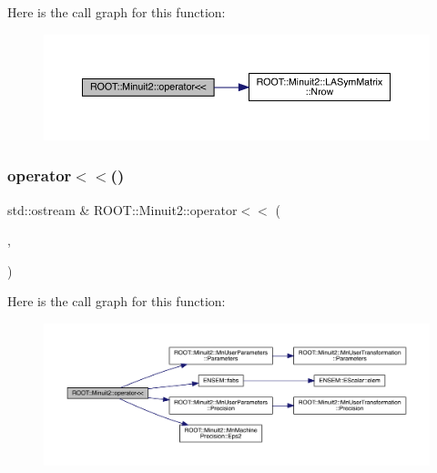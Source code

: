 Here is the call graph for this function\+:\nopagebreak
\begin{figure}[H]
\begin{center}
\leavevmode
\includegraphics[width=350pt]{d6/d3a/namespaceROOT_1_1Minuit2_a37c2d73b40109f988c5ea59e1edf1f8d_cgraph}
\end{center}
\end{figure}
\mbox{\label{namespaceROOT_1_1Minuit2_a950e1e56f48df042ba519464bda3f1ea}} 
\subsubsection{\texorpdfstring{operator$<$$<$()}{operator<<()}\hspace{0.1cm}{\footnotesize\ttfamily [5/11]}}
{\footnotesize\ttfamily std\+::ostream \& R\+O\+O\+T\+::\+Minuit2\+::operator$<$$<$ (\begin{DoxyParamCaption}\item[{std\+::ostream \&}]{,  }\item[{const \mbox{\hyperlink{classROOT_1_1Minuit2_1_1MnUserParameters}{Mn\+User\+Parameters}} \&}]{ }\end{DoxyParamCaption})}

Here is the call graph for this function\+:\nopagebreak
\begin{figure}[H]
\begin{center}
\leavevmode
\includegraphics[width=350pt]{d6/d3a/namespaceROOT_1_1Minuit2_a950e1e56f48df042ba519464bda3f1ea_cgraph}
\end{center}
\end{figure}
\mbox{\label{namespaceROOT_1_1Minuit2_ab0d367617b39c46b8b0eeef75ecc5b75}} 
